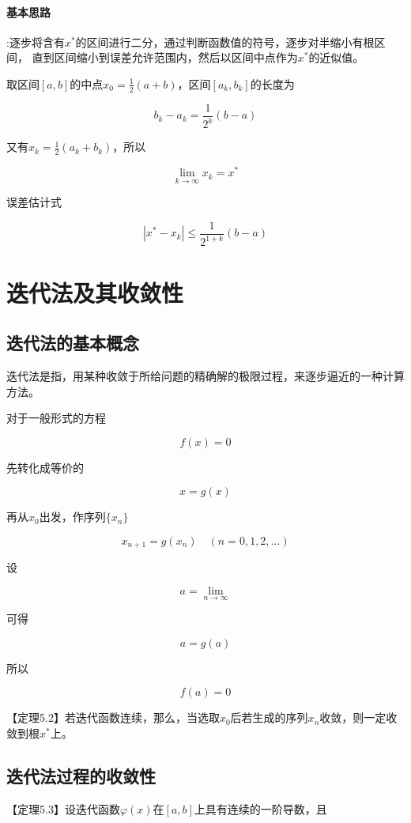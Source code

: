 \documentclass[12pt]{report}
\begin{document}
\paragraph{基本思路}:逐步将含有$x^*$的区间进行二分，通过判断函数值的符号，逐步对半缩小有根区间，
直到区间缩小到误差允许范围内，然后以区间中点作为$x^*$的近似值。

取区间$[a,b]$的中点$x_0=\frac{1}{2}(a+b)$，区间$[a_k , b_k]$的长度为

\[
	b_k - a_k = \frac{1}{2^k}(b - a)
\]

又有$x_k = \frac{1}{2}(a_k + b_k)$，所以

\[
	\lim_{k \to \infty} x_k = x^*
\]

误差估计式

\[
	|x^* - x_k| \leq \frac{1}{2^{1+k}}(b-a)
\]



\section{迭代法及其收敛性}

\subsection{迭代法的基本概念}

迭代法是指，用某种收敛于所给问题的精确解的极限过程，来逐步逼近的一种计算方法。

对于一般形式的方程

\[
	f(x) = 0
\]

先转化成等价的

\[
	x = g(x)
\]

再从$x_0$出发，作序列$\{x_n\}$

\[
	x_{n+1} = g(x_n) \quad (n=0, 1, 2, \ldots)
\]

设

\[
a = \lim_{n \to \infty} 
\]

可得

\[
	a=g(a)
\]

所以

\[
	f(a) = 0
\]

【定理5.2】若迭代函数连续，那么，当选取$x_0$后若生成的序列${x_n}$收敛，则一定收敛到根$x^*$上。


\subsection{迭代法过程的收敛性}

【定理5.3】设迭代函数$\varphi(x)$在$[a, b]$上具有连续的一阶导数，且
\end{document}
